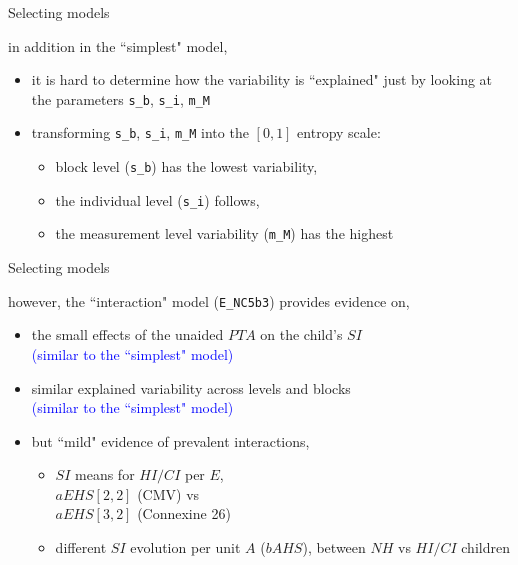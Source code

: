 %
%
\begin{lhframe}[rhgraphic={\texttt{[image: variability\_plot.pdf]}}]
	{Selecting models}
	
	in addition in the ``simplest" model,
	\begin{itemize}
		\item it is hard to determine how the variability is ``explained" just by looking at the parameters \texttt{s\_b}, \texttt{s\_i}, \texttt{m\_M}
		\item transforming \texttt{s\_b}, \texttt{s\_i}, \texttt{m\_M} into the $[0,1]$ entropy scale:
		\begin{itemize}
			\item block level (\texttt{s\_b}) has the lowest variability,
			\item the individual level (\texttt{s\_i}) follows,
			\item the measurement level variability (\texttt{m\_M}) has the highest
		\end{itemize}
	\end{itemize}
\end{lhframe}
%
%
\begin{lhframe}[rhgraphic={\texttt{[image: select\_model2.png]}}]
	{Selecting models}
	
	however, the ``interaction" model (\texttt{E\_NC5b3}) provides evidence on,
	\begin{itemize}
		\item the small effects of the unaided $PTA$ on the child's $SI$ \\
		{\small \textcolor{blue}{(similar to the ``simplest" model)}}
		\item similar explained variability across levels and blocks \\
		{\small \textcolor{blue}{(similar to the ``simplest" model)}}
		\item but ``mild" evidence of prevalent interactions,
		\begin{itemize}
			\item $SI$ means for $HI/CI$ per $E$, \\
			$aEHS[2,2]$ (CMV) vs \\
			$aEHS[3,2]$ (Connexine 26)
			\item different $SI$ evolution per unit $A$ ($bAHS$), between $NH$ vs $HI/CI$ children
		\end{itemize}
	\end{itemize}
\end{lhframe}
